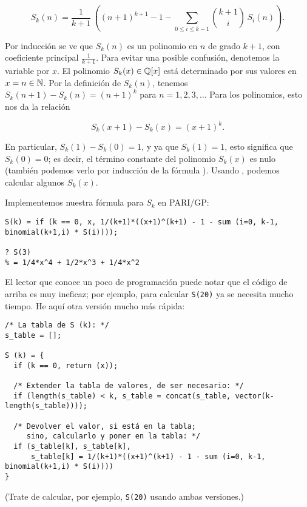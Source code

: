 \documentclass{article}
\begin{document}
\begin{equation}
\label{formula-para-Skn}
S_k (n) = \frac{1}{k+1} \, \left((n+1)^{k+1} - 1 - \sum_{0 \le i \le k-1} {k+1\choose i} \, S_i (n)\right).
\end{equation}

Por inducción se ve que $S_k (n)$ es un polinomio en $n$ de grado $k+1$, con coeficiente principal $\frac{1}{k+1}$. Para evitar una posible confusión, denotemos la variable por $x$. El polinomio $S_k (x) \in \mathbb{Q} [x]$ está determinado por sus valores en $x = n \in \mathbb{N}$. Por la definición de $S_k (n)$, tenemos $S_k (n+1) - S_k (n) = (n+1)^k$ para $n = 1,2,3,\ldots$ Para los polinomios, esto nos da la relación

\begin{equation}
\label{eqn:Skn+1-y-Skn}
S_k (x+1) - S_k (x) = (x+1)^k.
\end{equation}

En particular, $S_k (1) - S_k (0) = 1$, y ya que $S_k (1) = 1$, esto significa que $S_k (0) = 0$; es decir, el término constante del polinomio $S_k (x)$ es nulo (también podemos verlo por inducción de la fórmula ). Usando , podemos calcular algunos $S_k (x)$.

\begin{shaded}
\small

\noindent Implementemos nuestra fórmula para $S_k$ en PARI/GP:

\begin{verbatim}
S(k) = if (k == 0, x, 1/(k+1)*((x+1)^(k+1) - 1 - sum (i=0, k-1, binomial(k+1,i) * S(i))));

? S(3)
% = 1/4*x^4 + 1/2*x^3 + 1/4*x^2
\end{verbatim}

\noindent El lector que conoce un poco de programación puede notar que el código de arriba es muy ineficaz; por ejemplo, para calcular \verb|S(20)| ya se necesita mucho tiempo. He aquí otra versión mucho más rápida:

\begin{verbatim}
/* La tabla de S (k): */
s_table = [];

S (k) = {
  if (k == 0, return (x));

  /* Extender la tabla de valores, de ser necesario: */
  if (length(s_table) < k, s_table = concat(s_table, vector(k-length(s_table))));

  /* Devolver el valor, si está en la tabla;
     sino, calcularlo y poner en la tabla: */	
  if (s_table[k], s_table[k],
      s_table[k] = 1/(k+1)*((x+1)^(k+1) - 1 - sum (i=0, k-1, binomial(k+1,i) * S(i))))
}
\end{verbatim}

\noindent (Trate de calcular, por ejemplo, \verb|S(20)| usando ambas versiones.)
\end{shaded}
\end{document}
